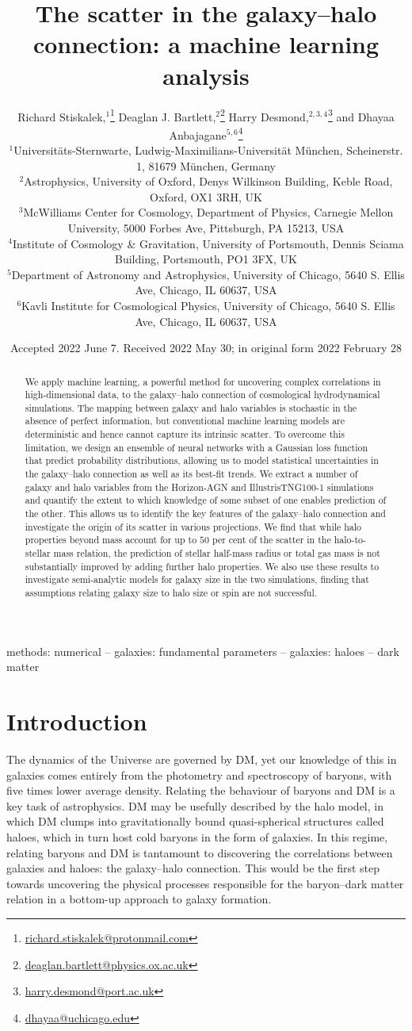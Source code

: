 \documentclass[useAMS,usenatbib]{mnras}
\title[The scatter in the galaxy--halo connection]{The scatter in the galaxy--halo connection: a machine learning analysis}
\author[R. Stiskalek et al.]
{Richard Stiskalek,$^{1}$\thanks{\href{mailto:richard.stiskalek@protonmail.com}{richard.stiskalek@protonmail.com}}
Deaglan J. Bartlett,$^{2}$\thanks{\href{mailto:deaglan.bartlett@physics.ox.ac.uk}{deaglan.bartlett@physics.ox.ac.uk}}
Harry Desmond,$^{2,3,4}$\thanks{\href{mailto:harry.desmond@port.ac.uk}{harry.desmond@port.ac.uk}}
and Dhayaa Anbajagane$^{5,6}$\thanks{\href{mailto:dhayaa@uchicago.edu}{dhayaa@uchicago.edu}}
\\
%
$^{1}$Universit\"{a}ts-Sternwarte, Ludwig-Maximilians-Universit\"{a}t M\"{u}nchen, Scheinerstr. 1, 81679 München, Germany\\
$^{2}$Astrophysics, University of Oxford, Denys Wilkinson Building, Keble Road, Oxford, OX1 3RH, UK\\
$^{3}$McWilliams Center for Cosmology, Department of Physics, Carnegie Mellon University, 5000 Forbes Ave, Pittsburgh, PA 15213, USA\\
$^4$Institute of Cosmology \& Gravitation, University of Portsmouth, Dennis Sciama Building, Portsmouth, PO1 3FX, UK\\
$^5$Department of Astronomy and Astrophysics, University of Chicago, 5640 S. Ellis Ave, Chicago, IL 60637, USA\\
$^6$Kavli Institute for Cosmological Physics, University of Chicago, 5640 S. Ellis Ave, Chicago, IL 60637, USA
}
\date{Accepted 2022 June 7. Received 2022 May 30; in original form 2022 February 28}
\begin{document}
\label{firstpage}
\pagerange{\pageref{firstpage}--\pageref{lastpage}}
\maketitle

\begin{abstract}
We apply machine learning, a powerful method for uncovering complex correlations in high-dimensional data, to the galaxy--halo connection of cosmological hydrodynamical simulations. The mapping between galaxy and halo variables is stochastic in the absence of perfect information, but conventional machine learning models are deterministic and hence cannot capture its intrinsic scatter. To overcome this limitation, we design an ensemble of neural networks with a Gaussian loss function that predict probability distributions, allowing us to model statistical uncertainties in the galaxy--halo connection as well as its best-fit trends. We extract a number of galaxy and halo variables from the Horizon-AGN and IllustrisTNG100-1 simulations and quantify the extent to which knowledge of some subset of one enables prediction of the other. This allows us to identify the key features of the galaxy--halo connection and investigate the origin of its scatter in various projections. We find that while halo properties beyond mass account for up to $50$ per cent of the scatter in the halo-to-stellar mass relation, the prediction of stellar half-mass radius or total gas mass is not substantially improved by adding further halo properties. We also use these results to investigate semi-analytic models for galaxy size in the two simulations, finding that assumptions relating galaxy size to halo size or spin are not successful.
\end{abstract}


\begin{keywords}
methods: numerical -- galaxies: fundamental parameters -- galaxies: haloes -- dark matter
\end{keywords}



\section{Introduction}\label{sec:Introduction}

The dynamics of the Universe are governed by \ac{DM}, yet our knowledge of this in galaxies comes entirely from the photometry and spectroscopy of baryons, with five times lower average density. Relating the behaviour of baryons and \ac{DM} is a key task of astrophysics. \ac{DM} may be usefully described by the halo model, in which \ac{DM} clumps into gravitationally bound quasi-spherical structures called haloes, which in turn host cold baryons in the form of galaxies. In this regime, relating baryons and \ac{DM} is tantamount to discovering the correlations between galaxies and haloes: the galaxy--halo connection. This would be the first step towards uncovering the physical processes responsible for the baryon--dark matter relation in a bottom-up approach to galaxy formation.
\end{document}
